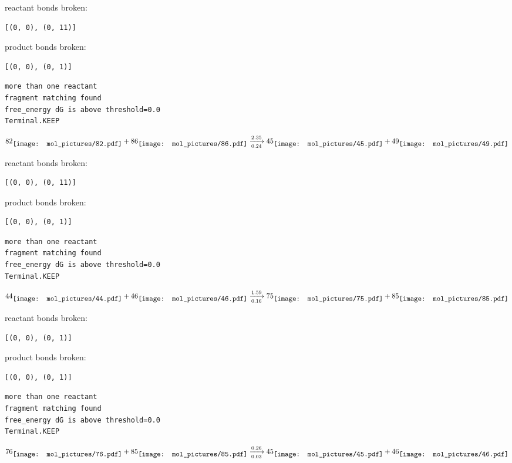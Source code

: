 \documentclass{article}
\begin{document}
reactant bonds broken:\begin{verbatim}
[(0, 0), (0, 11)]
\end{verbatim}
product bonds broken:\begin{verbatim}
[(0, 0), (0, 1)]
\end{verbatim}




\vspace{1cm}
\begin{verbatim}
more than one reactant
fragment matching found
free_energy dG is above threshold=0.0
Terminal.KEEP
\end{verbatim}
$$
82
\raisebox{-.5\height}{\texttt{[image: mol\_pictures/82.pdf]}}
+
86
\raisebox{-.5\height}{\texttt{[image: mol\_pictures/86.pdf]}}
\xrightarrow[0.24]{2.35}
45
\raisebox{-.5\height}{\texttt{[image: mol\_pictures/45.pdf]}}
+
49
\raisebox{-.5\height}{\texttt{[image: mol\_pictures/49.pdf]}}
$$


reactant bonds broken:\begin{verbatim}
[(0, 0), (0, 11)]
\end{verbatim}
product bonds broken:\begin{verbatim}
[(0, 0), (0, 1)]
\end{verbatim}




\vspace{1cm}
\begin{verbatim}
more than one reactant
fragment matching found
free_energy dG is above threshold=0.0
Terminal.KEEP
\end{verbatim}
$$
44
\raisebox{-.5\height}{\texttt{[image: mol\_pictures/44.pdf]}}
+
46
\raisebox{-.5\height}{\texttt{[image: mol\_pictures/46.pdf]}}
\xrightarrow[0.16]{1.59}
75
\raisebox{-.5\height}{\texttt{[image: mol\_pictures/75.pdf]}}
+
85
\raisebox{-.5\height}{\texttt{[image: mol\_pictures/85.pdf]}}
$$


reactant bonds broken:\begin{verbatim}
[(0, 0), (0, 1)]
\end{verbatim}
product bonds broken:\begin{verbatim}
[(0, 0), (0, 1)]
\end{verbatim}




\vspace{1cm}
\begin{verbatim}
more than one reactant
fragment matching found
free_energy dG is above threshold=0.0
Terminal.KEEP
\end{verbatim}
$$
76
\raisebox{-.5\height}{\texttt{[image: mol\_pictures/76.pdf]}}
+
85
\raisebox{-.5\height}{\texttt{[image: mol\_pictures/85.pdf]}}
\xrightarrow[0.03]{0.26}
45
\raisebox{-.5\height}{\texttt{[image: mol\_pictures/45.pdf]}}
+
46
\raisebox{-.5\height}{\texttt{[image: mol\_pictures/46.pdf]}}
$$
\end{document}
